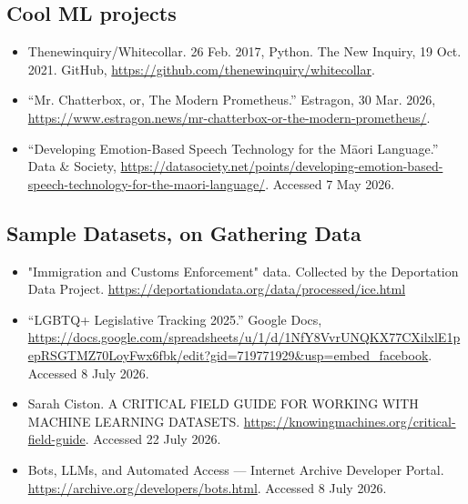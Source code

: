 \documentclass[12pt]{article}
\begin{document}
\subsection*{Cool ML projects}
\label{sec:orgebc2576}
\begin{itemize}
\item Thenewinquiry/Whitecollar. 26 Feb. 2017, Python. The New Inquiry, 19
Oct. 2021. GitHub, \url{https://github.com/thenewinquiry/whitecollar}.
\item “Mr. Chatterbox, or, The Modern Prometheus.” Estragon, 30 Mar. 2026,
\url{https://www.estragon.news/mr-chatterbox-or-the-modern-prometheus/}.
\item “Developing Emotion-Based Speech Technology for the Māori Language.”
Data \& Society,
\url{https://datasociety.net/points/developing-emotion-based-speech-technology-for-the-maori-language/}.
Accessed 7 May 2026.
\end{itemize}

\subsection*{Sample Datasets, on Gathering Data}
\label{sec:org8b03c8d}
\begin{itemize}
\item "Immigration and Customs Enforcement" data. Collected by the
Deportation Data Project. \url{https://deportationdata.org/data/processed/ice.html}
\item “LGBTQ+ Legislative Tracking 2025.” Google Docs, \url{https://docs.google.com/spreadsheets/u/1/d/1NfY8VvrUNQKX77CXilxlE1pepRSGTMZ70LoyFwx6fbk/edit?gid=719771929\&usp=embed\_facebook}.
Accessed 8 July 2026.
\item Sarah Ciston. A CRITICAL FIELD GUIDE FOR WORKING WITH MACHINE
LEARNING DATASETS. \url{https://knowingmachines.org/critical-field-guide}.
Accessed 22 July 2026.
\item Bots, LLMs, and Automated Access — Internet Archive Developer
Portal. \url{https://archive.org/developers/bots.html}. Accessed 8
July 2026.
\end{itemize}
\end{document}
